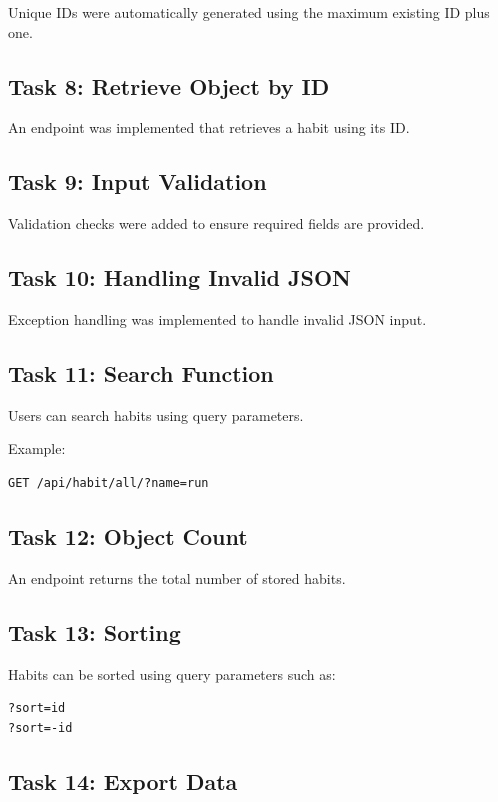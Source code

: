 \documentclass[12pt]{article}
\begin{document}
Unique IDs were automatically generated using the maximum existing ID plus one.

\subsection{Task 8: Retrieve Object by ID}

An endpoint was implemented that retrieves a habit using its ID.

\subsection{Task 9: Input Validation}

Validation checks were added to ensure required fields are provided.

\subsection{Task 10: Handling Invalid JSON}

Exception handling was implemented to handle invalid JSON input.

\subsection{Task 11: Search Function}

Users can search habits using query parameters.

Example:

\begin{verbatim}
GET /api/habit/all/?name=run
\end{verbatim}

\subsection{Task 12: Object Count}

An endpoint returns the total number of stored habits.

\subsection{Task 13: Sorting}

Habits can be sorted using query parameters such as:

\begin{verbatim}
?sort=id
?sort=-id
\end{verbatim}

\subsection{Task 14: Export Data}
\end{document}
